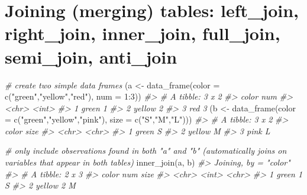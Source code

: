 \documentclass[
]{book}
\newenvironment{Shaded}{\begin{snugshade}}{\end{snugshade}}
\newcommand{\AttributeTok}[1]{\textcolor[rgb]{0.77,0.63,0.00}{#1}}
\newcommand{\CommentTok}[1]{\textcolor[rgb]{0.56,0.35,0.01}{\textit{#1}}}
\newcommand{\DecValTok}[1]{\textcolor[rgb]{0.00,0.00,0.81}{#1}}
\newcommand{\FunctionTok}[1]{\textcolor[rgb]{0.00,0.00,0.00}{#1}}
\newcommand{\NormalTok}[1]{#1}
\newcommand{\OtherTok}[1]{\textcolor[rgb]{0.56,0.35,0.01}{#1}}
\newcommand{\SpecialCharTok}[1]{\textcolor[rgb]{0.00,0.00,0.00}{#1}}
\newcommand{\StringTok}[1]{\textcolor[rgb]{0.31,0.60,0.02}{#1}}
\begin{document}
\hypertarget{joining-merging-tables-left_join-right_join-inner_join-full_join-semi_join-anti_join}{%
\section{Joining (merging) tables: left\_join, right\_join, inner\_join, full\_join, semi\_join, anti\_join}\label{joining-merging-tables-left_join-right_join-inner_join-full_join-semi_join-anti_join}}

\begin{Shaded}
\begin{Highlighting}[]
\CommentTok{\# create two simple data frames}
\NormalTok{(a }\OtherTok{\textless{}{-}} \FunctionTok{data\_frame}\NormalTok{(}\AttributeTok{color =} \FunctionTok{c}\NormalTok{(}\StringTok{"green"}\NormalTok{,}\StringTok{"yellow"}\NormalTok{,}\StringTok{"red"}\NormalTok{), }\AttributeTok{num =} \DecValTok{1}\SpecialCharTok{:}\DecValTok{3}\NormalTok{))}
\CommentTok{\#\textgreater{} \# A tibble: 3 x 2}
\CommentTok{\#\textgreater{}   color    num}
\CommentTok{\#\textgreater{}   \textless{}chr\textgreater{}  \textless{}int\textgreater{}}
\CommentTok{\#\textgreater{} 1 green      1}
\CommentTok{\#\textgreater{} 2 yellow     2}
\CommentTok{\#\textgreater{} 3 red        3}
\NormalTok{(b }\OtherTok{\textless{}{-}} \FunctionTok{data\_frame}\NormalTok{(}\AttributeTok{color =} \FunctionTok{c}\NormalTok{(}\StringTok{"green"}\NormalTok{,}\StringTok{"yellow"}\NormalTok{,}\StringTok{"pink"}\NormalTok{), }\AttributeTok{size =} \FunctionTok{c}\NormalTok{(}\StringTok{"S"}\NormalTok{,}\StringTok{"M"}\NormalTok{,}\StringTok{"L"}\NormalTok{)))}
\CommentTok{\#\textgreater{} \# A tibble: 3 x 2}
\CommentTok{\#\textgreater{}   color  size }
\CommentTok{\#\textgreater{}   \textless{}chr\textgreater{}  \textless{}chr\textgreater{}}
\CommentTok{\#\textgreater{} 1 green  S    }
\CommentTok{\#\textgreater{} 2 yellow M    }
\CommentTok{\#\textgreater{} 3 pink   L}

\CommentTok{\# only include observations found in both "a" and "b" (automatically joins on variables that appear in both tables)}
\FunctionTok{inner\_join}\NormalTok{(a, b)}
\CommentTok{\#\textgreater{} Joining, by = "color"}
\CommentTok{\#\textgreater{} \# A tibble: 2 x 3}
\CommentTok{\#\textgreater{}   color    num size }
\CommentTok{\#\textgreater{}   \textless{}chr\textgreater{}  \textless{}int\textgreater{} \textless{}chr\textgreater{}}
\CommentTok{\#\textgreater{} 1 green      1 S    }
\CommentTok{\#\textgreater{} 2 yellow     2 M}


\end{Highlighting}
\end{Shaded}
\end{document}
